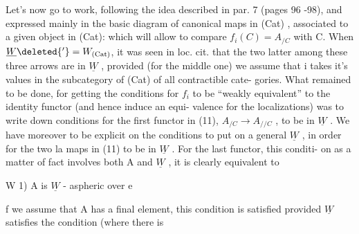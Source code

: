 Let's now go to work, following the idea described in par. 7
(pages 96 -98), and expressed mainly in the basic diagram of canonical
maps in (Cat) , associated to a given object  in (Cat):
which will allow to compare $f_i(C) = A_{/C}$ with C. When $\underline{W}\deleted{'} = W_{(\mathrm{Cat})}$, it
was seen in loc. cit. that the two latter among these three arrows
are in $\underline{W}$ ,  provided (for the middle one) we assume that
i takes it's values in the subcategory of (Cat) of all contractible cate-%
gories. What remained to be done, for getting the conditions for $f_i$ to
be ``weakly equivalent'' to the identity functor (and hence induce an equi-%
valence for the localizations) was to write down conditions for the
first functor in (11), $A_{/C} \to A_{//C}$ , to be in $\underline{W}$ . We have moreover to
be explicit on the conditions to put on a general $\underline{W}$ , in order for the
two la maps in (11) to be in $\underline{W}$ . For the last functor, this conditi-%
on as a matter of fact involves both A and $\underline{W}$ , it is clearly equivalent
to

W 1) A is $\underline{W}$ - aspheric over e \hand{\unsure{;}}

f we assume that A has a final element, this condition is 
satisfied provided $\underline{W}$ satisfies the  condition (where there is


